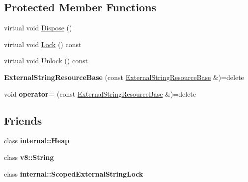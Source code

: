 \subsection*{Protected Member Functions}
\begin{DoxyCompactItemize}
\item 
virtual void \mbox{\hyperlink{classv8_1_1String_1_1ExternalStringResourceBase_af4720342ae31e1ab4656df3f15d069c0}{Dispose}} ()
\item 
virtual void \mbox{\hyperlink{classv8_1_1String_1_1ExternalStringResourceBase_ae539b974907cc2737e58797ace2652b4}{Lock}} () const
\item 
virtual void \mbox{\hyperlink{classv8_1_1String_1_1ExternalStringResourceBase_a6c6892d46c8fafaa938df542a6e334cd}{Unlock}} () const
\item 
\mbox{\label{classv8_1_1String_1_1ExternalStringResourceBase_a2e9ebb706e3ebb401b1055a865b0ae0f}} 
{\bfseries External\+String\+Resource\+Base} (const \mbox{\hyperlink{classv8_1_1String_1_1ExternalStringResourceBase}{External\+String\+Resource\+Base}} \&)=delete
\item 
\mbox{\label{classv8_1_1String_1_1ExternalStringResourceBase_a17df23bb8aab9ee8c9658d6ebaf99e8c}} 
void {\bfseries operator=} (const \mbox{\hyperlink{classv8_1_1String_1_1ExternalStringResourceBase}{External\+String\+Resource\+Base}} \&)=delete
\end{DoxyCompactItemize}
\subsection*{Friends}
\begin{DoxyCompactItemize}
\item 
\mbox{\label{classv8_1_1String_1_1ExternalStringResourceBase_a20a566310503e50c1b32668c772a14b2}} 
class {\bfseries internal\+::\+Heap}
\item 
\mbox{\label{classv8_1_1String_1_1ExternalStringResourceBase_a74072e7f09bdb13330b20ba10dcb8b55}} 
class {\bfseries v8\+::\+String}
\item 
\mbox{\label{classv8_1_1String_1_1ExternalStringResourceBase_a9f11ab15863611529297dca3f21c2979}} 
class {\bfseries internal\+::\+Scoped\+External\+String\+Lock}
\end{DoxyCompactItemize}


